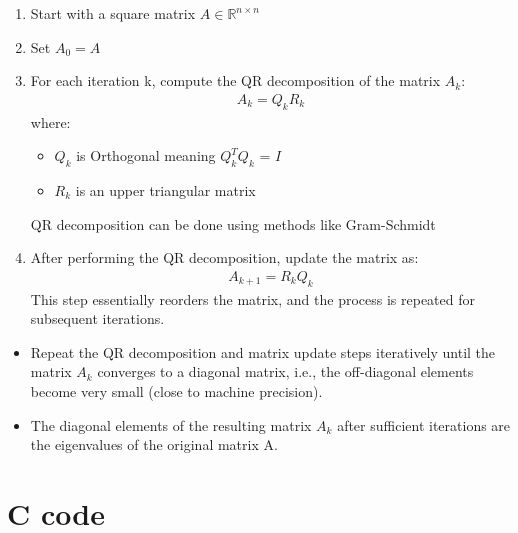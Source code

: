 \documentclass[journal]{IEEEtran}
\begin{document}
      \begin{enumerate}
     \item  Start with a square matrix $A \in \mathbb{R}^{n\times n}$
      \item Set $A_0 = A$
      \item For each iteration k, compute the QR decomposition of the matrix $A_{k}$:
      \begin{align*}
          A_k = Q_kR_k
      \end{align*}
      where: \begin{itemize}
          \item $Q_k$ is Orthogonal meaning $Q_k^T$$Q_k$ = $I$
          \item $R_k$ is an upper triangular matrix
      \end{itemize}
      QR decomposition can be done using methods like Gram-Schmidt
      
      \item After performing the QR decomposition, update the matrix as:
      \begin{align*}
          A_{k+1} = R_kQ_k
      \end{align*}
      This step essentially reorders the matrix, and the process is repeated for subsequent iterations.
    \end{enumerate}
    \begin{itemize}
        \item Repeat the QR decomposition and matrix update steps iteratively until the matrix $A_k$ converges to a diagonal matrix, i.e., the off-diagonal elements become very small (close to machine precision).        
        \item The diagonal elements of the resulting matrix $A_k$
  after sufficient iterations are the eigenvalues of the original matrix A.

      \end{itemize}
   


\section{\textbf{C code}}


  
\end{document}
